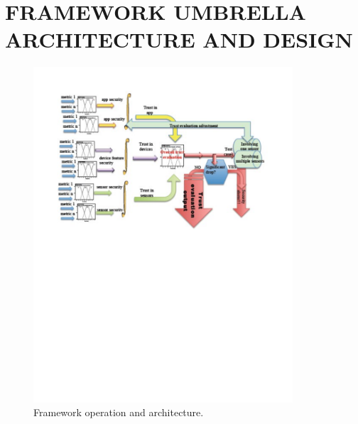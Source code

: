 \section{FRAMEWORK UMBRELLA ARCHITECTURE AND DESIGN}

\begin{figure}%
\centering
\includegraphics[width=3.8in]{umbrella_framework.pdf}
\caption{Framework operation and architecture.}
\label{fig:umbrella}
\end{figure}

